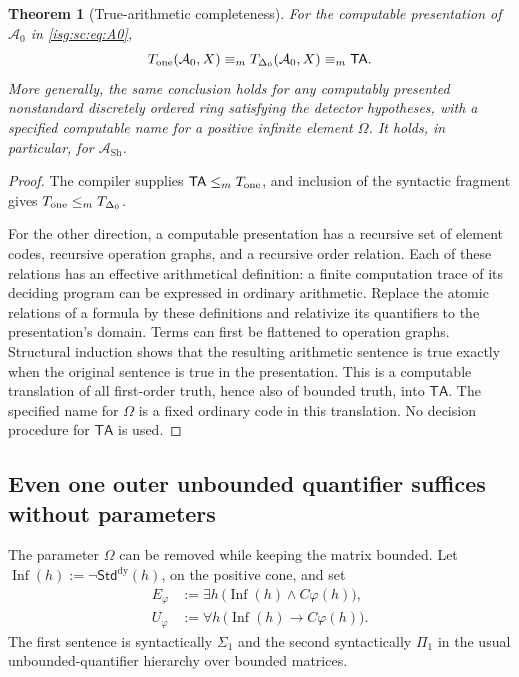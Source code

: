 \documentclass[11pt]{article}
\newtheorem{theorem}{Theorem}[section]
\theoremstyle{definition}
\theoremstyle{remark}
\newcommand{\StdDy}{\mathsf{Std}^{\mathrm{dy}}}
\newcommand{\TA}{\mathsf{TA}}
\newcommand{\Asc}{\mathcal{A}}
\begin{document}
\begin{theorem}[True-arithmetic completeness]\label{isg:sc:thm:complexity}
For the computable presentation of $\Asc_0$ in \eqref{isg:sc:eq:A0},
\[
 T_{\rm one}(\Asc_0,X)\equiv_mT_{\Delta_0}(\Asc_0,X)\equiv_m\TA.
\]
More generally, the same conclusion holds for any computably presented
nonstandard discretely ordered ring satisfying the detector hypotheses,
with a specified computable name for a positive infinite element $\Omega$.
It holds, in particular, for $\Asc_{\mathrm{Sh}}$.
\end{theorem}
\begin{proof}
The compiler supplies $\TA\le_mT_{\rm one}$, and inclusion of the
syntactic fragment gives $T_{\rm one}\le_mT_{\Delta_0}$.

For the other direction, a computable presentation has a recursive set of
element codes, recursive operation graphs, and a recursive order relation.
Each of these relations has an effective arithmetical definition: a finite
computation trace of its deciding program can be expressed in ordinary
arithmetic. Replace the atomic relations of a formula by these definitions
and relativize its quantifiers to the presentation's domain. Terms can
first be flattened to operation graphs. Structural induction shows that
the resulting arithmetic sentence is true exactly when the original
sentence is true in the presentation. This is a computable translation of
all first-order truth, hence also of bounded truth, into $\TA$. The
specified name for $\Omega$ is a fixed ordinary code in this translation.
No decision procedure for $\TA$ is used.
\end{proof}

\subsection{Even one outer unbounded quantifier suffices without parameters}
The parameter $\Omega$ can be removed while keeping the matrix bounded.
Let $\operatorname{Inf}(h):=\neg\StdDy(h)$, on the positive cone, and set
\begin{align}
 E_\varphi&:=\exists h\,
        \bigl(\operatorname{Inf}(h)\wedge C\varphi(h)\bigr),\label{isg:sc:eq:Esentence}\\
 U_\varphi&:=\forall h\,
        \bigl(\operatorname{Inf}(h)\to C\varphi(h)\bigr).\label{isg:sc:eq:Usentence}
\end{align}
The first sentence is syntactically $\Sigma_1$ and the second
syntactically $\Pi_1$ in the usual unbounded-quantifier hierarchy over
bounded matrices.
\end{document}
